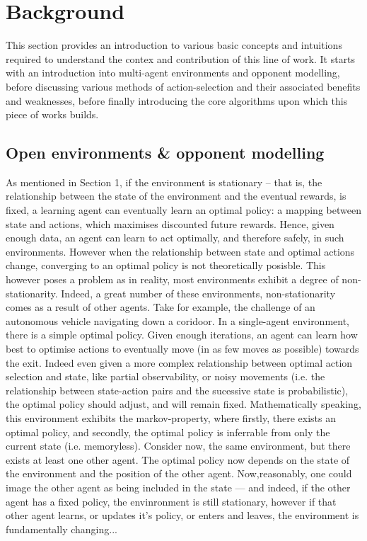 \section{Background}\label{Background}
This section provides an introduction to various basic concepts and intuitions required to understand the contex and contribution of this line of work. It starts with an introduction into multi-agent environments and opponent modelling, before discussing various methods of action-selection and their associated benefits and weaknesses, before finally introducing the core algorithms upon which this piece of works builds. 

\subsection{Open environments \& opponent modelling}
As mentioned in Section 1, if the environment is stationary -- that is, the relationship between the state of the environment and the eventual rewards, is fixed, a learning agent can eventually learn an optimal policy: a mapping between state and actions, which maximises discounted future rewards. 
Hence, given enough data, an agent can learn to act optimally, and therefore safely, in such environments. However when the relationship between state and optimal actions change, converging to an optimal policy is not theoretically posisble. This however poses a problem as in reality, most environments exhibit a degree of non-stationarity. Indeed, a great number of these environments, non-stationarity comes as a result of other agents. Take for example, the challenge of an autonomous vehicle navigating down a coridoor. 
\newline \newline
In a single-agent environment, there is a simple optimal policy. Given enough iterations, an agent can learn how best to optimise actions to eventually move (in as few moves as possible) towards the exit. 
\newline \newline
Indeed even given a more complex relationship between optimal action selection and state, like partial observability, or noisy movements (i.e. the relationship between state-action pairs and the sucessive state is probabilistic), the optimal policy should adjust, and will remain fixed. Mathematically speaking, this environment exhibits the markov-property, where firstly, there exists an optimal policy, and secondly, the optimal policy is inferrable from only the current state (i.e. memoryless).
\newline \newline
Consider now, the same environment, but there exists at least one other agent. The optimal policy now depends on the state of the environment and the position of the other agent. Now,reasonably, one could image the other agent as being included in the state --- and indeed, if the other agent has a fixed policy, the envinronment is still stationary, however if that other agent learns, or updates it's policy, or enters and leaves, the environment is fundamentally changing...  


